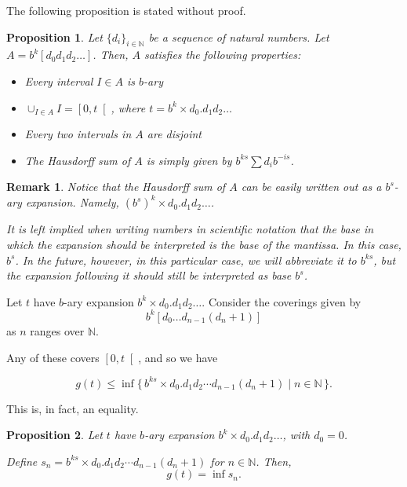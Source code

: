 \documentclass[11pt, reqno]{amsart}
\newcommand{\N}{\mathbb{N}}
\newtheorem{prop}{Proposition}
\newtheorem{remark}{Remark}
\begin{document}
The following proposition is stated without proof.

\begin{prop}
Let $\{d_i\}_{i \in \N}$ be a sequence of natural numbers. Let $A = b^k [d_0 d_1 d_2 \dots]$. Then, $A$ satisfies the following properties:

\begin{itemize}
\item Every interval $I \in A$ is $b$-ary

\item $\cup_{I \in A} I = \left[ 0, t \right[$, where $t = b^k \times d_0 . d_1 d_2 \dots$

\item Every two intervals in $A$ are disjoint

\item The Hausdorff sum of $A$ is simply given by $b^{ks} \sum d_i b^{-is}$.
\end{itemize}

\end{prop}

\begin{remark}
Notice that the Hausdorff sum of $A$ can be easily written out as a $b^s$-ary expansion. Namely, $(b^s)^k \times d_0 . d_1 d_ 2 \dots$.

It is left implied when writing numbers in scientific notation that the base in which the expansion should be interpreted is the base of the mantissa. In this case, $b^s$. In the future, however, in this particular case, we will abbreviate it to $b^{ks}$, but the expansion following it should still be interpreted as base $b^s$.
\end{remark}

Let $t$ have $b$-ary expansion $b^k \times d_0 . d_1 d_2 \dots$. Consider the coverings given by
\[ b^k [d_0 \dots d_{n-1} (d_n + 1)] \]
as $n$ ranges over $\N$.

Any of these covers $\left[0, t\right[$, and so we have

\[ g(t) \leq \inf \{\, b^{ks} \times d_0 . d_1 d_2 \cdots d_{n-1} (d_n + 1) \mid n \in \N\,\}.\]

This is, in fact, an equality.

\begin{prop} \label{ginfs}
Let $t$ have $b$-ary expansion $b^k \times d_0 . d_1 d_2 \dots$, with $d_0 = 0$.

Define $s_n = b^{ks} \times d_0 . d_1 d_2 \cdots d_{n-1} (d_n + 1)$ for $n \in \N$. Then,
\[ g(t) = \inf s_n.\]
\end{prop}
\end{document}
